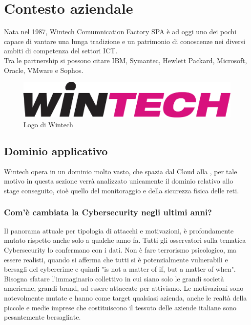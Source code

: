 \documentclass[Tesi.tex]{subfiles}
\begin{document}
\setcounter{chapter}{0}
\chapter{Contesto aziendale}

Nata nel 1987, Wintech Comumnication Factory SPA è ad oggi uno dei pochi  capace di vantare una lunga tradizione e un patrimonio di conoscenze nei diversi ambiti di competenza del settori ICT. \\
Tra le partnership si possono citare IBM, Symantec, Hewlett Packard, Microsoft, Oracle, VMware e Sophos.
\begin{figure}[H]
	\centering
	\includegraphics[width=0.7\linewidth]{"images/LogoWintech"}
	\caption{Logo di Wintech}
	\label{fig:Logo di Wintech}
\end{figure}

\section{Dominio applicativo}
Wintech opera in un dominio molto vasto, che spazia dal Cloud alla , per tale motivo in questa sezione verrà analizzato unicamente il dominio relativo allo stage conseguito, cioè quello del monitoraggio e della sicurezza fisica delle reti. \\

\subsection{Com'è cambiata la Cybersecurity negli ultimi anni?}
Il panorama attuale per tipologia di attacchi e motivazioni, è profondamente mutato rispetto anche solo a qualche anno fa. Tutti gli osservatori sulla tematica Cybersecurity lo confermano con i dati. Non è fare terrorismo psicologico, ma essere realisti, quando si afferma che tutti si è potenzialmente vulnerabili e bersagli del cybercrime e quindi "is not a matter of if, but a matter of when".\\
Bisogna sfatare l'immaginario collettivo in cui siano solo le grandi società americane, grandi brand, ad essere attaccate per attivismo. Le motivazioni sono notevolmente mutate e hanno come target qualsiasi azienda, anche le realtà della piccole e medie imprese che costituiscono il tessuto delle aziende italiane sono pesantemente bersagliate.
\end{document}
